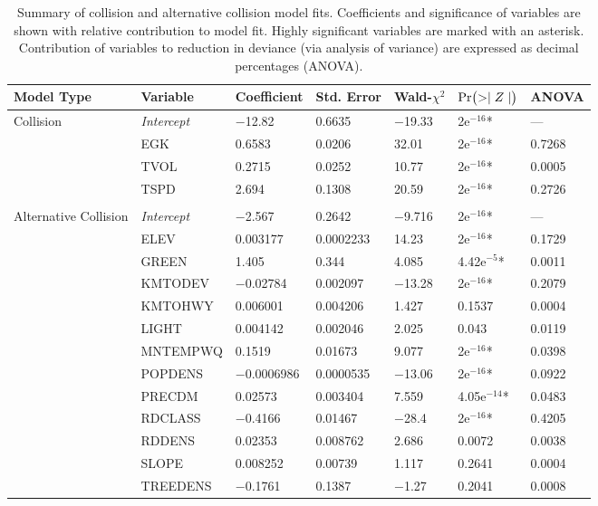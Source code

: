 \begin{table}[!h]
\caption[Summary of collision and alternative collision models]{Summary of collision and alternative collision model fits. Coefficients and significance of variables are shown with relative contribution to model fit. Highly significant variables are marked with an asterisk. Contribution of variables to reduction in deviance (via analysis of variance) are expressed as decimal percentages (ANOVA).}
\centering
\begin{tabularx}{0.9\textwidth}{lllllll} \toprule
Model Type &Variable         &Coefficient &Std. Error			&Wald-$\chi^2$ &$\text{Pr}\bigl( >\mid Z \mid \bigr)$ &ANOVA\\ \midrule 
Collision  				&\emph{Intercept}	& $-$12.82			& 0.6635   	& $-$19.33	&\TL 2e$^{-16}$*	& --- \\
           				& EGK				& 0.6583			& 0.0206   	& 32.01		&\TL 2e$^{-16}$*	& 0.7268 \\
           				& TVOL				& 0.2715			& 0.0252   	& 10.77		&\TL 2e$^{-16}$*	& 0.0005 \\
           				& TSPD				& 2.694				& 0.1308   	& 20.59		&\TL 2e$^{-16}$*	& 0.2726 \\
           				&                  	&                 	&         	&         	&       	& \\
Alternative Collision	& \emph{Intercept} 	& $-$2.567 			& 0.2642	& $-$9.716 	&\TL 2e$^{-16}$*	& --- \\ 
   						& ELEV				& 0.003177			& 0.0002233	& 14.23 	&\TL 2e$^{-16}$*	& 0.1729 \\ 
   						& GREEN				& 1.405				& 0.344 	& 4.085		& 4.42e$^{-5}$*	& 0.0011 \\ 
   						& KMTODEV			& $-$0.02784			& 0.002097 	& $-$13.28 	&\TL 2e$^{-16}$*	& 0.2079 \\ 
   						& KMTOHWY			& 0.006001			& 0.004206 	& 1.427 	& 0.1537 	& 0.0004 \\ 
   						& LIGHT				& 0.004142			& 0.002046 	& 2.025 	& 0.043 	& 0.0119 \\ 
   						& MNTEMPWQ			& 0.1519			& 0.01673 	& 9.077 	&\TL 2e$^{-16}$*	& 0.0398 \\ 
   						& POPDENS			& $-$0.0006986		& 0.0000535	& $-$13.06 	&\TL 2e$^{-16}$*	& 0.0922 \\ 
   						& PRECDM			& 0.02573			& 0.003404 	& 7.559 	& 4.05e$^{-14}$*	& 0.0483 \\ 
   						& RDCLASS			& $-$0.4166			& 0.01467 	& $-$28.4 	&\TL 2e$^{-16}$*	& 0.4205 \\ 
   						& RDDENS			& 0.02353			& 0.008762 	& 2.686 	& 0.0072 	& 0.0038 \\ 
   						& SLOPE				& 0.008252			& 0.00739 	& 1.117 	& 0.2641	& 0.0004 \\ 
   						& TREEDENS			& $-$0.1761			& 0.1387 	& $-$1.27 	& 0.2041	& 0.0008 \\ 
\bottomrule
\end{tabularx}
\label{egk_sum_coll}
\end{table}

